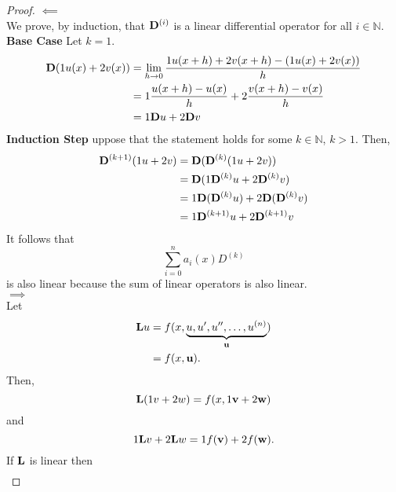 \begin{proof}\(\impliedby\)\\
	We prove, by induction, that \(\mathrm{\bf{D}}^{(i)}\) is a linear differential operator for all \(i \in \mathbb{N}\).\\
	\textbf{Base Case} Let \(k=1\).\\
	\begin{equation}
		\begin{split}
			\mathrm{\bf{D}} (1 u(x) + 2 v(x)) &= \lim_{h\to 0} \frac{1 u(x+h) + 2 v(x+h)-(1 u(x) + 2 v(x))}{h}\\
			&=1 \frac{u(x+h) - u(x)}{h} + 2 \frac{v(x+h)-v(x)}{h}\\
			&= 1 \mathrm{\bf{D}} u + 2 \mathrm{\bf{D}} v
		\end{split}
	\end{equation}
	\textbf{Induction Step} uppose that the statement holds for some \(k\in\mathbb{N}\), \(k>1\). Then,
	\begin{equation}
		\begin{split}
			\mathrm{\bf{D}}^{(k+1)} (1 u + 2 v) &= \mathrm{\bf{D}} ( \mathrm{\bf{D}}^{(k)}(1 u + 2 v))\\
			&=\mathrm{\bf{D}}(1 \mathrm{\bf{D}}^{(k)} u + 2 \mathrm{\bf{D}}^{(k)} v)\\
			&=1 \mathrm{\bf{D}}(\mathrm{\bf{D}}^{(k)} u) + 2 \mathrm{\bf{D}} (\mathrm{\bf{D}}^{(k)} v)\\
			&= 1 \mathrm{\bf{D}}^{(k+1)} u + 2 \mathrm{\bf{D}}^{(k+1)} v
		\end{split}
	\end{equation}
	It follows that 
	\begin{equation}
		\sum_{i=0}^{n} a_i(x) D^{(k)}
	\end{equation}
	is also linear because the sum of linear operators is also linear.\\
	\(\implies\)\\
	Let
	\begin{equation}
		\begin{split}
			\mathrm{\bf{L}} u &= f(x, \underbrace{u, u', u'', \dots, u^{(n)}}_{\textbf{u}})\\
			&=f(x, \textbf{u}).
		\end{split}
	\end{equation}
	Then,
	\begin{equation}
		\mathrm{\bf{L}} (1 v + 2 w) = f(x, 1 \textbf{v} + 2 \textbf{w})
	\end{equation}
	and
	\begin{equation}
		1 \mathrm{\bf{L}} v + 2 \mathrm{\bf{L}} w = 1 f(\textbf{v}) + 2 f(\textbf{w}).
	\end{equation}
	If \(\mathrm{\bf{L}}\) is linear then 
	\begin{equation}
		\begin{split}

\end{split}
\end{equation}
\end{proof}
